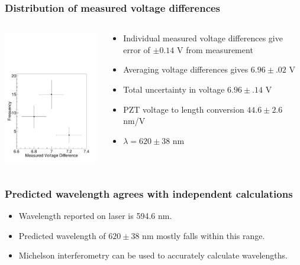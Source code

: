 \documentclass{beamer}
\begin{document}
\begin{frame}
  \frametitle{Distribution of measured voltage differences}
  \begin{columns}
    \begin{column}{0.5\textwidth}
  \includegraphics[width=6.5cm]{graph_helvetica}
\end{column}

\begin{column}{0.5\textwidth}
  \begin{itemize}
    \item Individual measured voltage differences give error of $\pm 0.14$ V from measurement
      \pause
    \item Averaging voltage differences gives $6.96 \pm .02$ V 
      \pause
    \item Total uncertainty in voltage $6.96 \pm .14$ V
      \pause
    \item PZT voltage to length conversion $44.6 \pm 2.6$ nm/V
      \pause
    \item $\lambda = 620 \pm 38$ nm
  \end{itemize}
  \end{column}
\end{columns}
\end{frame}

\begin{frame}
  \frametitle{Predicted wavelength agrees with independent calculations}
  \begin{itemize}
    \item Wavelength reported on laser is 594.6 nm.
  \item Predicted wavelength of $620 \pm 38$ nm mostly falls within this range.
  \item Michelson interferometry can be used to accurately calculate wavelengths.
\end{itemize}
\end{frame}
\end{document}
